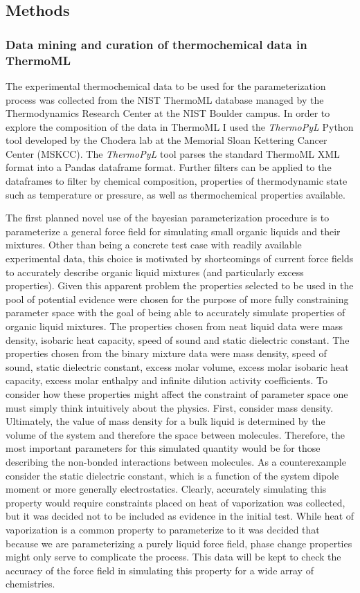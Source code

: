 \documentclass[rmp,nofootinbib,superscriptaddress,12pt,tightenlines,notitlepage]{revtex4-1}
\begin{document}
\subsection{Methods}
\subsubsection{Data mining and curation of thermochemical data in ThermoML}
The experimental thermochemical data to be used for the parameterization process was collected from the NIST ThermoML database managed by the 
Thermodynamics Research Center at the  NIST Boulder campus. In order to explore the composition of the data in ThermoML I used the \textit{ThermoPyL}
Python tool developed by the Chodera lab at the Memorial Sloan Kettering Cancer Center (MSKCC).\cite{thermopyl} The \textit{ThermoPyL} tool parses the
standard ThermoML XML format into a Pandas dataframe format. Further filters can be applied to the dataframes to filter by chemical composition, 
properties of thermodynamic state such as temperature or pressure, as well as thermochemical properties available.

The first planned novel use of the bayesian parameterization procedure is to parameterize a general force field for simulating small organic liquids
and their mixtures. Other than being a concrete test case with readily available experimental data, this choice is motivated by shortcomings of current
force fields to accurately describe organic liquid mixtures (and particularly excess properties).\cite{mix} Given this apparent problem the properties
selected to be used in the pool of potential evidence were chosen for the purpose of more fully constraining parameter space with the goal of being 
able to accurately simulate properties of organic liquid mixtures. The properties chosen from neat liquid data were mass density, isobaric heat capacity, 
speed of sound and static dielectric constant. The properties chosen from the binary mixture data were mass density, speed of sound, static dielectric constant, excess molar volume, excess molar isobaric heat capacity, excess molar enthalpy and infinite dilution activity coefficients. To consider how these properties
might affect the constraint of parameter space one must simply think intuitively about the physics. First, consider mass density. Ultimately, the value of mass 
density for a bulk liquid is determined by the volume of the system and therefore the space between molecules. Therefore, the most important parameters for 
this simulated quantity would be for those describing the non-bonded interactions between molecules. As a counterexample consider the static dielectric constant, 
which is a function of the system dipole moment or more generally electrostatics. Clearly, accurately simulating this property would require constraints placed 
on heat of vaporization was 
collected, but it was decided not to be included as evidence in the initial test. While heat of vaporization is a common property to parameterize to it was 
decided that because we are parameterizing a purely liquid force field, phase change properties might only serve to complicate the process. This data will 
be kept to check the accuracy of the force field in simulating this property for a wide array of chemistries. 
\end{document}
